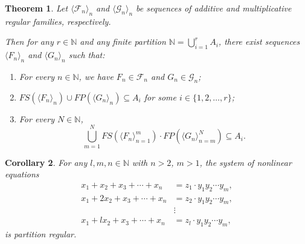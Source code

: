 \documentclass{article}
\theoremstyle{Theorem}
\newtheorem{thm}{Theorem}[section]
\newtheorem{cor}[thm]{Corollary}
\theoremstyle{definition}
\begin{document}
\begin{thm}\label{notask}
Let $\langle \mathcal{F}_n \rangle_n$ and $\langle \mathcal{G}_n \rangle_n$ be sequences of additive and multiplicative regular families, respectively.

Then for any \( r \in \mathbb{N} \) and any finite partition \( \mathbb{N} = \bigcup_{i=1}^r A_i \), there exist sequences \( \langle F_n \rangle_n \) and \( \langle G_n \rangle_n \) such that:
\begin{enumerate}
    \item For every \( n \in \mathbb{N} \), we have \( F_n \in \mathcal{F}_n \) and \( G_n \in \mathcal{G}_n \);
    \item \( FS\left( \langle F_n \rangle_n \right) \cup FP\left( \langle G_n \rangle_n \right) \subseteq A_i \) for some \( i \in \{1,2,\ldots,r\} \);
    \item For every \( N \in \mathbb{N} \),
    \[
    \bigcup_{m=1}^N FS\left( \langle F_n \rangle_{n=1}^m \right) \cdot FP\left( \langle G_n \rangle_{n=m}^N \right) \subseteq A_i.
    \]
\end{enumerate}
\end{thm}


\begin{cor}
    For any \( l, m, n \in \mathbb{N} \) with \( n > 2 \), \( m > 1 \), the system of nonlinear equations
    \begin{align*}
        x_1 + x_2 + x_3 + \cdots + x_n &= z_1 \cdot y_1 y_2 \cdots y_m, \\
        x_1 + 2 x_2 + x_3 + \cdots + x_n &= z_2 \cdot y_1 y_2 \cdots y_m, \\
        &\vdots \\
        x_1 + l x_2 + x_3 + \cdots + x_n &= z_l \cdot y_1 y_2 \cdots y_m,
    \end{align*}
    is partition regular.
\end{cor}
\end{document}
